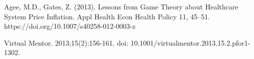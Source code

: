 \documentclass{article}
\begin{document}
\begin{thebibliography}{8}
Agee, M.D., Gates, Z. (2013). Lessons from Game Theory about Healthcare System Price Inflation. Appl Health Econ Health Policy 11, 45–51. https://doi.org/10.1007/s40258-012-0003-z

Virtual Mentor. 2013;15(2):156-161. doi: 10.1001/virtualmentor.2013.15.2.pfor1-1302.



\end{thebibliography}

\end{document}
